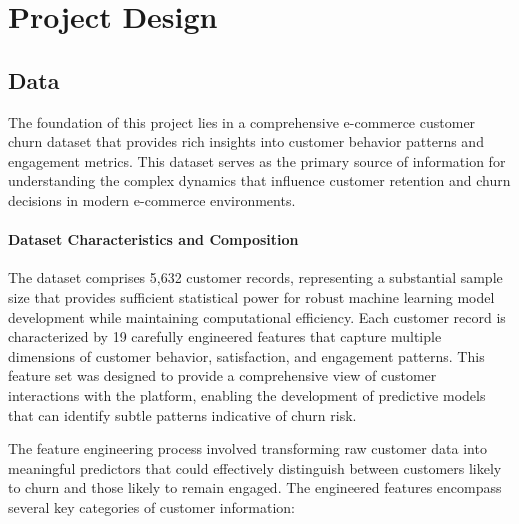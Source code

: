 \documentclass{article}
\begin{document}
\section{Project Design}

\subsection{Data}

The foundation of this project lies in a comprehensive e-commerce customer churn dataset that provides rich insights into customer behavior patterns and engagement metrics. This dataset serves as the primary source of information for understanding the complex dynamics that influence customer retention and churn decisions in modern e-commerce environments.

\paragraph{Dataset Characteristics and Composition}

The dataset comprises 5,632 customer records, representing a substantial sample size that provides sufficient statistical power for robust machine learning model development while maintaining computational efficiency. Each customer record is characterized by 19 carefully engineered features that capture multiple dimensions of customer behavior, satisfaction, and engagement patterns. This feature set was designed to provide a comprehensive view of customer interactions with the platform, enabling the development of predictive models that can identify subtle patterns indicative of churn risk.

The feature engineering process involved transforming raw customer data into meaningful predictors that could effectively distinguish between customers likely to churn and those likely to remain engaged. The engineered features encompass several key categories of customer information:
\end{document}
